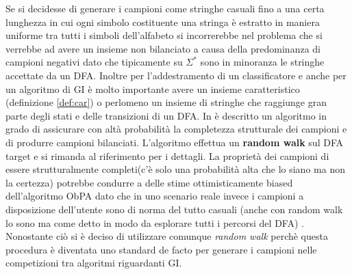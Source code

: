 Se si decidesse di generare  i campioni come stringhe casuali fino a una certa lunghezza in cui ogni simbolo costituente una stringa è estratto in maniera uniforme tra tutti i simboli dell'alfabeto si  incorrerebbe nel problema che  si verrebbe ad avere un insieme non bilanciato a causa della predominanza di campioni negativi dato che tipicamente su $\Sigma^*$ sono in minoranza le stringhe accettate da un \ac{DFA}. 
Inoltre  per l'addestramento di un classificatore e anche per un algoritmo di \ac{GI} è molto importante avere un insieme caratteristico (definizione \ref{def:car}) o perlomeno un insieme di stringhe che raggiunge gran parte degli stati e delle transizioni di un \ac{DFA}.
In \cite{Stamina10} è descritto un algoritmo in grado di assicurare con altà probabilità la completezza strutturale dei campioni e di produrre campioni bilanciati. L'algoritmo effettua un \textbf{random walk} sul \ac{DFA} target e si rimanda al riferimento per i dettagli.
La proprietà dei campioni di essere strutturalmente completi(c'è solo una probabilità alta che lo siano ma non la certezza) potrebbe condurre a delle stime ottimisticamente biased dell'algoritmo \ac{ObPA} dato che in uno scenario reale invece i campioni a disposizione dell'utente sono di norma del tutto casuali (anche con random walk lo sono ma come detto in modo da esplorare tutti i percorsi del \ac{DFA})  . Nonostante ciò si è deciso  di utilizzare comunque \textit{random walk}  perchè  questa procedura è diventata uno standard de facto per generare i campioni nelle competizioni tra algoritmi riguardanti \ac{GI}.

